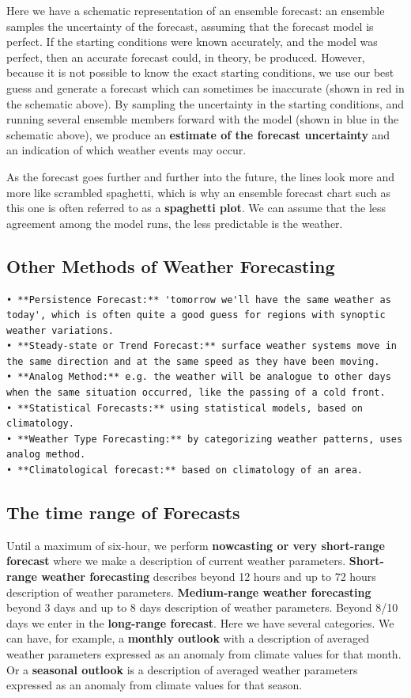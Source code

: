 \documentclass[12pt,oneside]{book}
\begin{document}
Here we have a schematic representation of an ensemble forecast: an
ensemble samples the uncertainty of the forecast, assuming that the
forecast model is perfect. If the starting conditions were known
accurately, and the model was perfect, then an accurate forecast could,
in theory, be produced. However, because it is not possible to know the
exact starting conditions, we use our best guess and generate a forecast
which can sometimes be inaccurate (shown in red in the schematic above).
By sampling the uncertainty in the starting conditions, and running
several ensemble members forward with the model (shown in blue in the
schematic above), we produce an \textbf{estimate of the forecast
uncertainty} and an indication of which weather events may occur.

As the forecast goes further and further into the future, the lines look
more and more like scrambled spaghetti, which is why an ensemble
forecast chart such as this one is often referred to as a
\textbf{spaghetti plot}. We can assume that the less agreement among the
model runs, the less predictable is the weather.

\subsection{Other Methods of Weather
Forecasting}\label{other-methods-of-weather-forecasting}

\begin{verbatim}
• **Persistence Forecast:** 'tomorrow we'll have the same weather as today', which is often quite a good guess for regions with synoptic weather variations. 
• **Steady-state or Trend Forecast:** surface weather systems move in the same direction and at the same speed as they have been moving.
• **Analog Method:** e.g. the weather will be analogue to other days when the same situation occurred, like the passing of a cold front.
• **Statistical Forecasts:** using statistical models, based on climatology.
• **Weather Type Forecasting:** by categorizing weather patterns, uses analog method.
• **Climatological forecast:** based on climatology of an area.
\end{verbatim}

\subsection{The time range of
Forecasts}\label{the-time-range-of-forecasts}

Until a maximum of six-hour, we perform \textbf{nowcasting or very
short-range forecast} where we make a description of current weather
parameters. \textbf{Short-range weather forecasting} describes beyond 12
hours and up to 72 hours description of weather parameters.
\textbf{Medium-range weather forecasting} beyond 3 days and up to 8 days
description of weather parameters. Beyond 8/10 days we enter in the
\textbf{long-range forecast}. Here we have several categories. We can
have, for example, a \textbf{monthly outlook} with a description of
averaged weather parameters expressed as an anomaly from climate values
for that month. Or a \textbf{seasonal outlook} is a description of
averaged weather parameters expressed as an anomaly from climate values
for that season.
\end{document}
